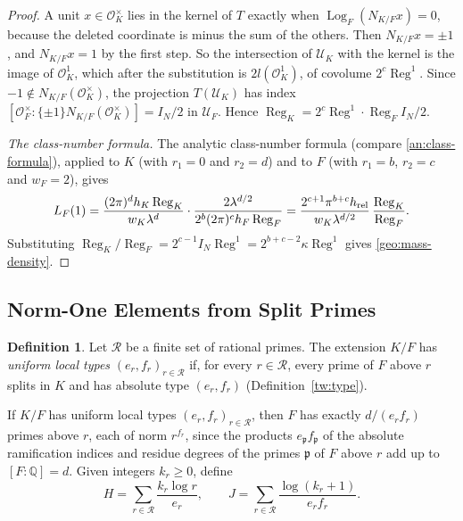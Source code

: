 \documentclass[11pt]{amsart}
\numberwithin{equation}{section}
\theoremstyle{definition}
\newtheorem{definition}[equation]{Definition}
\theoremstyle{remark}
\newcommand{\Q}{\mathbb Q}
\begin{document}
\begin{proof}
A unit $x\in\mathcal O_K^\times$ lies in the kernel of $T$ exactly
when $\operatorname{Log}_F(N_{K/F}x)=0$, because the deleted coordinate
is minus the sum of the others. Then $N_{K/F}x=\pm1$, and $N_{K/F}x=1$
by the first step. So the intersection of $\mathcal U_K$ with the kernel is
the image of $\mathcal O_K^1$, which after the substitution is
$2l(\mathcal O_K^1)$, of covolume $2^c\operatorname{Reg}^1$. Since
$-1\notin N_{K/F}(\mathcal O_K^\times)$, the projection
$T(\mathcal U_K)$ has index
$[\mathcal O_F^\times:\{\pm1\}N_{K/F}(\mathcal O_K^\times)]=I_N/2$ in
$\mathcal U_F$. Hence
$\operatorname{Reg}_K=2^c\operatorname{Reg}^1\cdot\operatorname{Reg}_FI_N/2$.

\emph{The class-number formula.} The analytic class-number formula
\cite[Chapter~V, Theorem~2.4]{MilneCFT} (compare
\eqref{an:class-formula}), applied to $K$ (with $r_1=0$
and $r_2=d$) and to $F$ (with $r_1=b$, $r_2=c$ and $w_F=2$), gives
\[
 L_F(1)=\frac{(2\pi)^dh_K\operatorname{Reg}_K}{w_K\lambda^d}\cdot
 \frac{2\lambda^{d/2}}{2^b(2\pi)^ch_F\operatorname{Reg}_F}
 =\frac{2^{c+1}\pi^{b+c}h_{\rm rel}}{w_K\lambda^{d/2}}\,
 \frac{\operatorname{Reg}_K}{\operatorname{Reg}_F}.
\]
Substituting
$\operatorname{Reg}_K/\operatorname{Reg}_F=2^{c-1}I_N\operatorname{Reg}^1
=2^{b+c-2}\kappa\operatorname{Reg}^1$ gives \eqref{geo:mass-density}.
\end{proof}

\subsection{Norm-One Elements from Split Primes}

\begin{definition}\label{geo:uniform-types}
Let $\mathcal R$ be a finite set of rational primes. The extension $K/F$
has \emph{uniform local types} $(e_r,f_r)_{r\in\mathcal R}$ if, for every
$r\in\mathcal R$, every prime of $F$ above $r$ splits in $K$ and has
absolute type $(e_r,f_r)$ (Definition~\ref{tw:type}).
\end{definition}

If $K/F$ has uniform local types $(e_r,f_r)_{r\in\mathcal R}$, then $F$
has exactly $d/(e_rf_r)$ primes above $r$, each of norm $r^{f_r}$, since
the products $e_{\mathfrak p}f_{\mathfrak p}$ of the absolute ramification
indices and residue degrees of the primes $\mathfrak p$ of $F$ above $r$
add up to $[F:\Q]=d$. Given integers $k_r\ge0$, define
\begin{equation}\label{geo:HJ}
 H=\sum_{r\in\mathcal R}\frac{k_r\log r}{e_r},\qquad
 J=\sum_{r\in\mathcal R}\frac{\log(k_r+1)}{e_rf_r}.
\end{equation}
\end{document}
